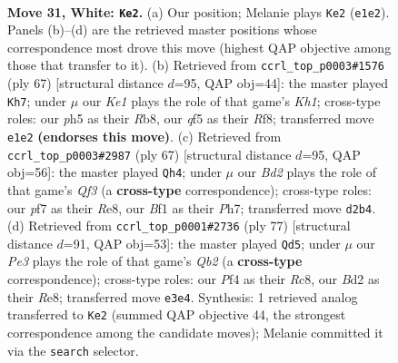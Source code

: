 \documentclass[11pt]{article}
\begin{document}
\clearpage

\begin{figure}[p]\centering
\begin{subfigure}{0.46\textwidth}\centering
\resizebox{\linewidth}{!}{%
\newchessgame
\chessboard[
  setfen={1r1rnk2/p1p2p2/8/2Pp1q1p/5P2/1P2P3/1Q1B2RP/4KBR1 w - - 1 31},
  showmover=false,
  pgfstyle=straightmove, color=movearrow, markmove={e1-e2}
]}
\caption{}
\end{subfigure}\hfill
\begin{subfigure}{0.46\textwidth}\centering
\resizebox{\linewidth}{!}{%
\newchessgame
\chessboard[
  setfen={1r3r1k/5Pp1/p3p2p/4N3/p2R1Q1P/1b6/2q2PP1/B5K1 b - - 2 34},
  showmover=false,
  pgfstyle=straightmove, color=movearrow, markmove={h8-h7}
]}
\caption{}
\end{subfigure}
\\[4pt]
\begin{subfigure}{0.46\textwidth}\centering
\resizebox{\linewidth}{!}{%
\newchessgame
\chessboard[
  setfen={4r2k/7p/5q2/Q2Prb2/P1p2p2/5P2/6PP/2RRNK2 b - - 1 34},
  showmover=false,
  pgfstyle=straightmove, color=movearrow, markmove={f6-h4}
]}
\caption{}
\end{subfigure}\hfill
\begin{subfigure}{0.46\textwidth}\centering
\resizebox{\linewidth}{!}{%
\newchessgame
\chessboard[
  setfen={2r1r1k1/1q4b1/6p1/6Np/4p2P/2p1P1PQ/2R2P2/2R3K1 b - - 0 39},
  showmover=false,
  pgfstyle=straightmove, color=movearrow, markmove={b7-d5}
]}
\caption{}
\end{subfigure}
\caption{\textbf{Move 31, White: \texttt{Ke2}.} (a) Our position; Melanie plays \texttt{Ke2} (\texttt{e1e2}). Panels (b)--(d) are the retrieved master positions whose correspondence most drove this move (highest QAP objective among those that transfer to it). (b) Retrieved from \texttt{ccrl\_top\_p0003\#1576} (ply 67) [structural distance $d$=95, QAP obj=44]: the master played \texttt{Kh7}; under $\mu$ our \emph{Ke1} plays the role of that game's \emph{Kh1}; cross-type roles: our \emph{p}h5 as their \emph{R}b8, our \emph{q}f5 as their \emph{R}f8; transferred move \texttt{e1e2} \textbf{(endorses this move)}. (c) Retrieved from \texttt{ccrl\_top\_p0003\#2987} (ply 67) [structural distance $d$=95, QAP obj=56]: the master played \texttt{Qh4}; under $\mu$ our \emph{Bd2} plays the role of that game's \emph{Qf3} (a \textbf{cross-type} correspondence); cross-type roles: our \emph{p}f7 as their \emph{R}e8, our \emph{B}f1 as their \emph{P}h7; transferred move \texttt{d2b4}. (d) Retrieved from \texttt{ccrl\_top\_p0001\#2736} (ply 77) [structural distance $d$=91, QAP obj=53]: the master played \texttt{Qd5}; under $\mu$ our \emph{Pe3} plays the role of that game's \emph{Qb2} (a \textbf{cross-type} correspondence); cross-type roles: our \emph{P}f4 as their \emph{R}c8, our \emph{B}d2 as their \emph{R}e8; transferred move \texttt{e3e4}. Synthesis: 1 retrieved analog transferred to \texttt{Ke2} (summed QAP objective 44, the strongest correspondence among the candidate moves); Melanie committed it via the \texttt{search} selector.}
\label{fig:thought-m60}
\end{figure}
\end{document}
